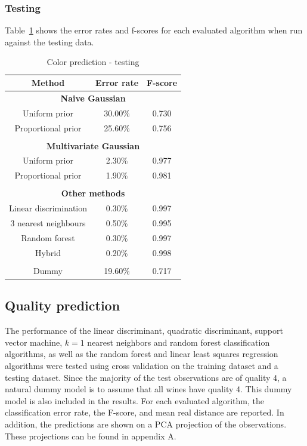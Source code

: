 \documentclass[twoside]{article}
\begin{document}
\begin{multicols}{2}
\subsubsection{Testing}

Table~\ref{table:color_testing} shows the error rates and f-scores for each evaluated algorithm when run against the testing data.

\begin{table}[H]
\caption{Color prediction - testing}
\label{table:color_testing}
\begin{tabular}{ccc}
\textbf{Method} & \textbf{Error rate} & \textbf{F-score}\\
\midrule
\multicolumn{3}{c}{\textbf{Naive Gaussian}} \\
Uniform prior & 30.00\% & 0.730 \\
Proportional prior & 25.60\% & 0.756 \\
\\
\multicolumn{3}{c}{\textbf{Multivariate Gaussian}} \\
Uniform prior & 2.30\% & 0.977 \\
Proportional prior & 1.90\% & 0.981 \\
\\
\multicolumn{3}{c}{\textbf{Other methods}} \\
Linear discrimination & 0.30\% & 0.997 \\
$3$ nearest neighbours & 0.50\% & 0.995 \\
Random forest & 0.30\% & 0.997 \\
Hybrid & 0.20\% & 0.998 \\
\\
Dummy & 19.60\% & 0.717 \\
\end{tabular}
\end{table}

\subsection{Quality prediction}

The performance of the linear discriminant, quadratic discriminant, support vector machine, $k=1$ nearest neighbors and random forest
classification algorithms, as well as the random forest and linear least squares regression algorithms were tested using cross validation 
on the training dataset and a testing dataset.
Since the majority of the test observations are of quality 4, a natural dummy model is to assume that all wines have quality 4.
This dummy model is also included in the results.
For each evaluated algorithm, the classification error rate, the F-score, and mean real distance are reported. In addition, the predictions are shown on a PCA projection
of the observations. These projections can be found in appendix A.


\end{multicols}
\end{document}

